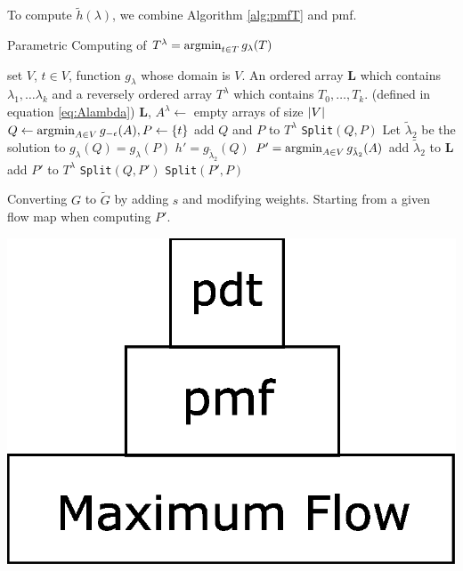 \documentclass[portrait,final,archE,fontscale=0.3]{baposter}
\begin{document}
\begin{poster}
{\begin{multicols}{2}
To compute $\tilde{h}(\lambda)$, we combine Algorithm \ref{alg:pmfT} and \textsf{pmf}.
\begin{algorithm}[H]
	\caption{
		{\footnotesize
		Parametric Computing of $T^{\lambda} = \operatorname*{argmin}_{t\in T} g_{\lambda}(T)$
		}
	}\label{alg:pmfT}
	\begin{algorithmic}[1]
		\REQUIRE set $V$, $t \in V$, function $g_{\lambda}$ whose domain is $V$.
		\ENSURE An ordered array \textbf{L} which contains $\lambda_1, \dots \lambda_k$ and a reversely ordered array $T^{\lambda}$ which contains $T_0,\dots, T_k$. (defined in equation \eqref{eq:Alambda})
		\STATE \textbf{L}, $A^{\lambda} \leftarrow$ empty arrays of size $\lvert V\rvert$
		\STATE $Q \leftarrow \operatorname*{argmin}_{A\in V} g_{-\epsilon}(A), P \leftarrow \{ t \}$ \label{alg:uini}
		\STATE add $Q$ and $P$ to $T^{\lambda}$
		\STATE \texttt{Split}$(Q,P)$
		\STATE Let $\tilde{\lambda}_2$ be the solution to $g_{\lambda}(Q) =  g_{\lambda}(P)$
		\STATE $h' = g_{\tilde{\lambda}_2}(Q)$
		\STATE $P' =\operatorname*{argmin}_{A\in V} g_{\tilde{\lambda}_2}(A)$  \label{alg:Pap}
		\STATE add  $\tilde{\lambda}_2$ to $\mathbf{L}$
		\ELSE
		\STATE add $P'$ to $T^{\lambda}$ \label{alg:addP}
		\STATE \texttt{Split}$(Q,P')$
		\STATE \texttt{Split}$(P',P)$
		\ENDIF
		\ENDFUNCTION
	\end{algorithmic}
\end{algorithm}
{

}
\begin{multicols}{2}		
Converting $G$ to $\widetilde{G}$ by adding $s$ and modifying weights.
Starting from a given flow map when computing $P'$.

\includegraphics[width=0.65\linewidth]{img/pdt.eps}
\end{multicols}
\end{multicols}

}

\end{poster}
\end{document}
